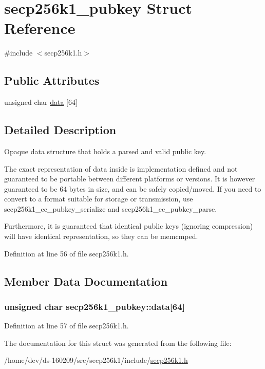 \hypertarget{structsecp256k1__pubkey}{}\section{secp256k1\+\_\+pubkey Struct Reference}
\label{structsecp256k1__pubkey}


{\ttfamily \#include $<$secp256k1.\+h$>$}

\subsection*{Public Attributes}
\begin{DoxyCompactItemize}
\item 
unsigned char \hyperlink{structsecp256k1__pubkey_a337cef146cd8002610da4b04a91ee7ce}{data} \mbox{[}64\mbox{]}
\end{DoxyCompactItemize}


\subsection{Detailed Description}
Opaque data structure that holds a parsed and valid public key.

The exact representation of data inside is implementation defined and not guaranteed to be portable between different platforms or versions. It is however guaranteed to be 64 bytes in size, and can be safely copied/moved. If you need to convert to a format suitable for storage or transmission, use secp256k1\+\_\+ec\+\_\+pubkey\+\_\+serialize and secp256k1\+\_\+ec\+\_\+pubkey\+\_\+parse.

Furthermore, it is guaranteed that identical public keys (ignoring compression) will have identical representation, so they can be memcmp\textquotesingle{}ed. 

Definition at line 56 of file secp256k1.\+h.



\subsection{Member Data Documentation}
\hypertarget{structsecp256k1__pubkey_a337cef146cd8002610da4b04a91ee7ce}{}
\subsubsection[{data}]{\setlength{\rightskip}{0pt plus 5cm}unsigned char secp256k1\+\_\+pubkey\+::data\mbox{[}64\mbox{]}}\label{structsecp256k1__pubkey_a337cef146cd8002610da4b04a91ee7ce}


Definition at line 57 of file secp256k1.\+h.



The documentation for this struct was generated from the following file\+:\begin{DoxyCompactItemize}
\item 
/home/dev/ds-\/160209/src/secp256k1/include/\hyperlink{secp256k1_8h}{secp256k1.\+h}\end{DoxyCompactItemize}
